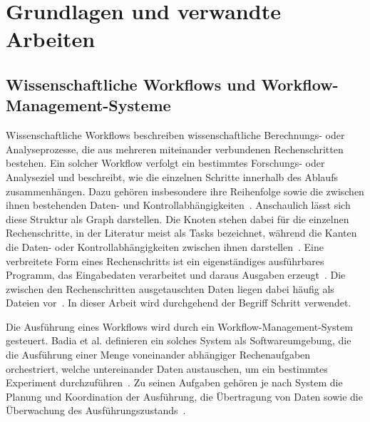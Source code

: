
\chapter{Grundlagen und verwandte Arbeiten}
\label{sec:basics}



\section{Wissenschaftliche Workflows und Workflow-Management-Systeme}
\label{sec:basics:wms}
Wissenschaftliche Workflows beschreiben wissenschaftliche
Berechnungs- oder Analyseprozesse, die aus mehreren miteinander
verbundenen Rechenschritten bestehen. Ein solcher Workflow verfolgt
ein bestimmtes Forschungs- oder Analyseziel und beschreibt, wie die
einzelnen Schritte innerhalb des Ablaufs zusammenhängen. Dazu
gehören insbesondere ihre Reihenfolge sowie die zwischen ihnen
bestehenden Daten- und
Kontrollabhängigkeiten~\cite[S.~2]{suter2026terminology}.
Anschaulich lässt sich diese Struktur als Graph darstellen. Die
Knoten stehen dabei für die einzelnen Rechenschritte, in der
Literatur meist als Tasks bezeichnet, während die Kanten die Daten-
oder Kontrollabhängigkeiten zwischen ihnen
darstellen~\cite[S.~28\,f.]{badia2017workflows}. Eine verbreitete
Form eines Rechenschritts ist ein eigenständiges ausführbares
Programm, das Eingabedaten verarbeitet und daraus Ausgaben
erzeugt~\cite[S.~4]{suter2026terminology}. Die zwischen den
Rechenschritten ausgetauschten Daten liegen dabei häufig als Dateien
vor~\cite[S.~29]{badia2017workflows}. In dieser
Arbeit wird durchgehend der Begriff Schritt verwendet.
 
Die Ausführung eines Workflows wird durch ein
Workflow-Management-System gesteuert. Badia et al. definieren ein
solches System als Softwareumgebung, die die Ausführung einer Menge
voneinander abhängiger Rechenaufgaben orchestriert, welche
untereinander Daten austauschen, um ein bestimmtes Experiment
durchzuführen~\cite[S.~28]{badia2017workflows}.
Zu seinen Aufgaben gehören je nach System die Planung und
Koordination der Ausführung, die Übertragung von Daten sowie die
Überwachung des Ausführungszustands~\cite[S.~29]{badia2017workflows}\cite[S.~2]{suter2026terminology}.

